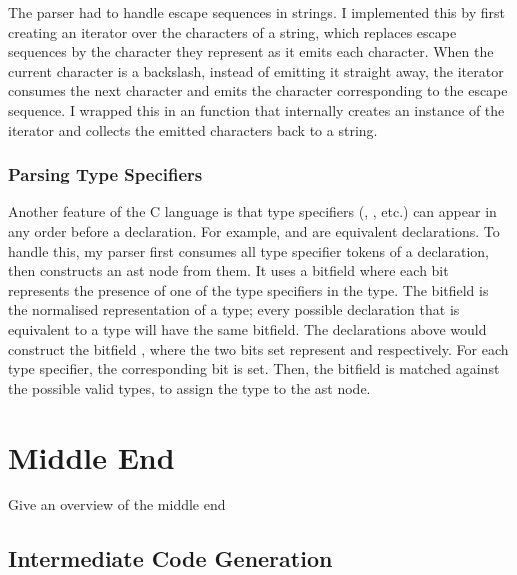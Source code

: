\documentclass[00-main.tex]{subfiles}
\begin{document}
The parser had to handle escape sequences in strings.
I implemented this by first creating an iterator over the characters of a string, which replaces escape sequences by the character they represent as it emits each character.
When the current character is a backslash, instead of emitting it straight away, the iterator consumes the next character and emits the character corresponding to the escape sequence.
I wrapped this in an  function that internally creates an instance of the iterator and collects the emitted characters back to a string.

\subsubsection{Parsing Type Specifiers}

Another feature of the C language is that type specifiers (, , etc.) can appear in any order before a declaration.
For example,  and  are equivalent declarations.
To handle this, my parser first consumes all type specifier tokens of a declaration, then constructs an  \gls{ast} node from them.
It uses a bitfield where each bit represents the presence of one of the type specifiers in the type.
The bitfield is the normalised representation of a type; every possible declaration that is equivalent to a type will have the same bitfield.
The declarations above would construct the bitfield , where the two bits set represent  and  respectively.
For each type specifier, the corresponding bit is set.
Then, the bitfield is matched against the possible valid types, to assign the type to the \gls{ast} node.


\section{Middle End}

\begin{mrwComment}
Give an overview of the middle end
\end{mrwComment}

\subsection{Intermediate Code Generation}
\end{document}
